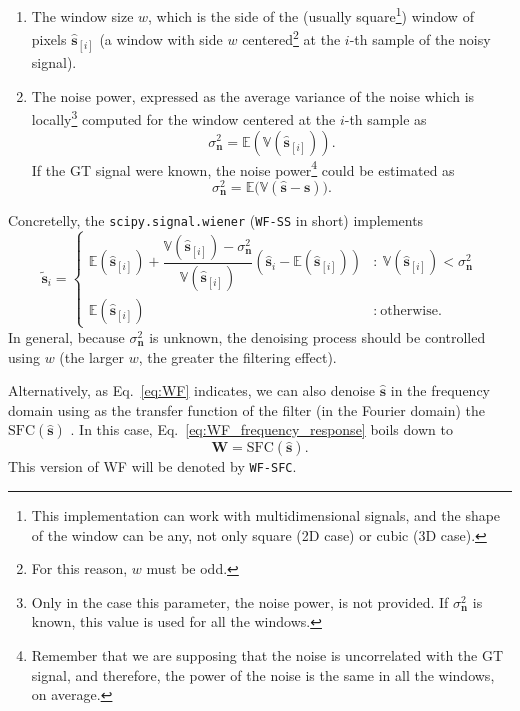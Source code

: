 \begin{enumerate}
\item The window size $w$, which is the side of the (usually
  square\footnote{This implementation can work with multidimensional
    signals, and the shape of the window can be any, not only square
    (2D case) or cubic (3D case).}) window of pixels
  $\hat{\mathbf{s}}_{[i]}$ (a window with side $w$
  centered\footnote{For this reason, $w$ must be odd.} at the $i$-th
  sample of the noisy signal).
\item The noise power, expressed as the average variance of the noise
  which is locally\footnote{Only in the case this parameter, the noise
    power, is not provided. If ${\sigma^2_{\mathbf{n}}}$ is known,
    this value is used for all the windows.} computed for the window
  centered at the $i$-th sample as
  \begin{equation}
    {\sigma^2_{\mathbf{n}}}=\mathbb{E}\left(\mathbb{V}(\hat{\mathbf{s}}_{[i]})\right).
  \end{equation}
  If the \gls{GT} signal were known, the noise power\footnote{Remember
    that we are supposing that the noise is uncorrelated with the GT
    signal, and therefore, the power of the noise is the same in all
    the windows, on average.}  could be estimated as
  \begin{equation}
    {\sigma^2_{\mathbf{n}}} = \mathbb{E}\big(\mathbb{V}(\hat{\mathbf{s}}-\mathbf{s})\big).
  \end{equation}
\end{enumerate}
Concretelly, the \texttt{scipy.signal.wiener} (\texttt{WF-SS} in short) implements
\begin{equation}
  \tilde{\mathbf{s}}_i = \left\{
    \begin{array}{ll}
      \mathbb{E}(\hat{\mathbf{s}}_{[i]}) + \dfrac{\mathbb{V}(\hat{\mathbf{s}}_{[i]})-\sigma^2_\mathbf{n}}{\mathbb{V}(\hat{\mathbf{s}}_{[i]})}\left(\hat{\mathbf{s}}_i-\mathbb{E}(\hat{\mathbf{s}}_{[i]})\right) & : \ \mathbb{V}(\hat{\mathbf{s}}_{[i]}) < \sigma^2_\mathbf{n} \\
      \mathbb{E}(\hat{\mathbf{s}}_{[i]}) & : \ \text{otherwise.}
    \end{array} \right.
\end{equation}
In general, because $\sigma^2_{\mathbf{n}}$ is unknown, the denoising
process should be controlled using $w$ (the larger $w$, the greater
the filtering effect).

Alternatively, as Eq.~\ref{eq:WF} indicates, we can also denoise
$\hat{\mathbf{s}}$ in the frequency domain using as the transfer
function of the filter (in the Fourier domain) the
$\text{SFC}(\hat{\mathbf{s}})$ \cite{verbeke2024self}. In this case,
Eq.~\ref{eq:WF_frequency_response} boils down to
\begin{equation}
  \mathbf{W} = \text{SFC}(\hat{\mathbf{s}}).
  \label{eq:WF_SFC}
\end{equation}
This version of \gls{WF} will be denoted by \texttt{WF-SFC}.

